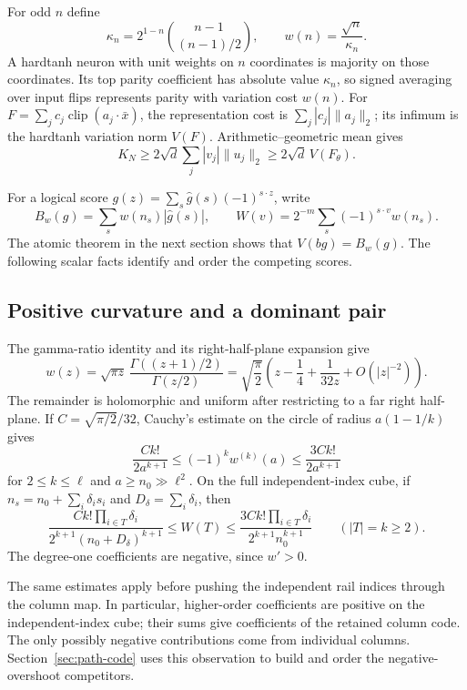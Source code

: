 \documentclass[11pt]{article}
\theoremstyle{remark}\newtheorem{remark}[theorem]{Remark}
\newcommand{\clip}{\operatorname{clip}}\newcommand{\dist}{\operatorname{dist}}
\begin{document}
For odd $n$ define
\begin{equation}\label{eq:parity-cost}
 \kappa_n=2^{1-n}\binom{n-1}{(n-1)/2},\qquad w(n)=\frac{\sqrt n}{\kappa_n}.
\end{equation}
A hardtanh neuron with unit weights on $n$ coordinates is majority
on those coordinates. Its top parity coefficient has absolute value
$\kappa_n$, so signed averaging over input flips represents parity
with variation cost $w(n)$. For $F=\sum_jc_j\clip(a_j\cdot\bar x)$,
the representation cost is $\sum_j|c_j|\|a_j\|_2$; its infimum is
the hardtanh variation norm $V(F)$. Arithmetic--geometric mean gives
\begin{equation}\label{eq:variation-energy}
 K_N\ge2\sqrt d\sum_j|v_j|\|u_j\|_2\ge2\sqrt d\,V(F_\theta).
\end{equation}

For a logical score $g(z)=\sum_s\widehat g(s)(-1)^{s\cdot z}$,
write
\[
 B_w(g)=\sum_s w(n_s)|\widehat g(s)|,\qquad
 W(v)=2^{-m}\sum_s(-1)^{s\cdot v}w(n_s).
\]
The atomic theorem in the next section shows that $V(bg)=B_w(g)$.
The following scalar facts identify and order the competing scores.

\subsection{Positive curvature and a dominant pair}

The gamma-ratio identity and its right-half-plane expansion give
\begin{equation}\label{eq:cost-expansion}
 w(z)=\sqrt{\pi z}\,\frac{\Gamma((z+1)/2)}{\Gamma(z/2)}
 =\sqrt{\frac\pi2}\left(z-\frac14+\frac1{32z}+O(|z|^{-2})\right).
\end{equation}
The remainder is holomorphic and uniform after restricting to a far
right half-plane. If $C=\sqrt{\pi/2}/32$, Cauchy's estimate on the
circle of radius $a(1-1/k)$ gives
\[
 \frac{Ck!}{2a^{k+1}}\le(-1)^k w^{(k)}(a)
 \le\frac{3Ck!}{2a^{k+1}}
\]
for $2\le k\le\ell$ and $a\ge n_0\gg\ell^2$. On the full
independent-index cube, if
$n_s=n_0+\sum_i\delta_i s_i$ and $D_\delta=\sum_i\delta_i$, then
\begin{equation}\label{eq:walsh-bounds}
 \frac{Ck!\prod_{i\in T}\delta_i}{2^{k+1}(n_0+D_\delta)^{k+1}}
 \le W(T)\le
 \frac{3Ck!\prod_{i\in T}\delta_i}{2^{k+1}n_0^{k+1}}
 \qquad(|T|=k\ge2).
\end{equation}
The degree-one coefficients are negative, since $w'>0$.

The same estimates apply before pushing the independent rail indices
through the column map. In particular, higher-order coefficients are
positive on the independent-index cube; their sums give coefficients
of the retained column code. The only possibly negative contributions
come from individual columns. Section~\ref{sec:path-code} uses this
observation to build and order the negative-overshoot competitors.
\end{document}
